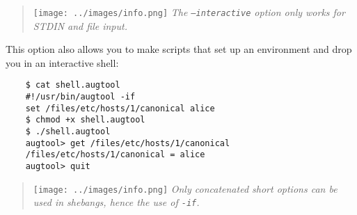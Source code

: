\begin{quote}
\texttt{[image: ../images/info.png]} \emph{The \texttt{--interactive} option only works for STDIN and file input.}

\end{quote}
This option also allows you to make scripts that set up an environment and drop you in an interactive shell:

   

\begin{verbatim}
    $ cat shell.augtool
    #!/usr/bin/augtool -if
    set /files/etc/hosts/1/canonical alice
    $ chmod +x shell.augtool
    $ ./shell.augtool
    augtool> get /files/etc/hosts/1/canonical
    /files/etc/hosts/1/canonical = alice
    augtool> quit
\end{verbatim}

\begin{quote}
\texttt{[image: ../images/info.png]} \emph{Only concatenated short options can be used in shebangs, hence the use of \texttt{-if}.}
\end{quote}
